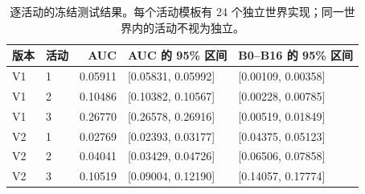 \begin{table}[tbp]
\centering\small
\setlength{\tabcolsep}{4pt}
\caption{逐活动的冻结测试结果。每个活动模板有 24 个独立世界实现；同一世界内的活动不视为独立。}\label{tab:v2-activities}
\begin{tabular}{llrll}
\toprule
版本 & 活动 & AUC & AUC 的 95\% 区间 & B0--B16 的 95\% 区间 \\
\midrule
V1 & 1 & 0.05911 & [0.05831, 0.05992] & [0.00109, 0.00358] \\
V1 & 2 & 0.10486 & [0.10382, 0.10567] & [0.00228, 0.00785] \\
V1 & 3 & 0.26770 & [0.26578, 0.26916] & [0.00519, 0.01849] \\
V2 & 1 & 0.02769 & [0.02393, 0.03177] & [0.04375, 0.05123] \\
V2 & 2 & 0.04041 & [0.03429, 0.04726] & [0.06506, 0.07858] \\
V2 & 3 & 0.10519 & [0.09004, 0.12190] & [0.14057, 0.17774] \\
\bottomrule
\end{tabular}
\end{table}
